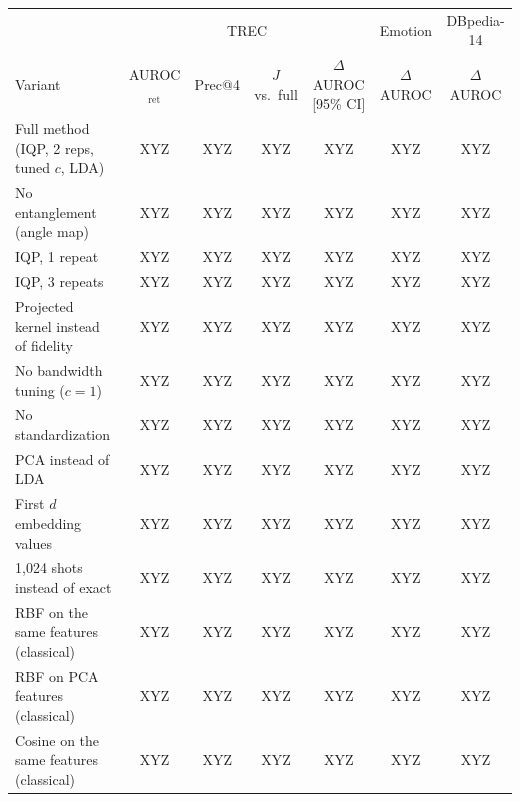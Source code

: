 \begin{tabular}{@{}l cccc cc@{}}
\toprule
 & \multicolumn{4}{c}{TREC} & Emotion & DBpedia-14 \\
\cmidrule(lr){2-5}\cmidrule(lr){6-6}\cmidrule(lr){7-7}
Variant & AUROC$_\mathrm{ret}$ & Prec@4 & $J$ vs.\ full & $\Delta$AUROC [95\% CI] & $\Delta$AUROC & $\Delta$AUROC \\
\midrule
Full method (IQP, 2 reps, tuned $c$, LDA) & XYZ & XYZ & XYZ & XYZ & XYZ & XYZ \\
\midrule
No entanglement (angle map) & XYZ & XYZ & XYZ & XYZ & XYZ & XYZ \\
IQP, 1 repeat & XYZ & XYZ & XYZ & XYZ & XYZ & XYZ \\
IQP, 3 repeats & XYZ & XYZ & XYZ & XYZ & XYZ & XYZ \\
\midrule
Projected kernel instead of fidelity & XYZ & XYZ & XYZ & XYZ & XYZ & XYZ \\
\midrule
No bandwidth tuning ($c{=}1$) & XYZ & XYZ & XYZ & XYZ & XYZ & XYZ \\
No standardization & XYZ & XYZ & XYZ & XYZ & XYZ & XYZ \\
\midrule
PCA instead of LDA & XYZ & XYZ & XYZ & XYZ & XYZ & XYZ \\
First $d$ embedding values & XYZ & XYZ & XYZ & XYZ & XYZ & XYZ \\
\midrule
1{,}024 shots instead of exact & XYZ & XYZ & XYZ & XYZ & XYZ & XYZ \\
\midrule
RBF on the same features (classical) & XYZ & XYZ & XYZ & XYZ & XYZ & XYZ \\
RBF on PCA features (classical) & XYZ & XYZ & XYZ & XYZ & XYZ & XYZ \\
Cosine on the same features (classical) & XYZ & XYZ & XYZ & XYZ & XYZ & XYZ \\
\bottomrule
\end{tabular}
